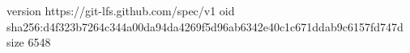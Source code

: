 version https://git-lfs.github.com/spec/v1
oid sha256:d4f323b7264c344a00da94da4269f5d96ab6342e40c1c671ddab9c6157fd747d
size 6548
